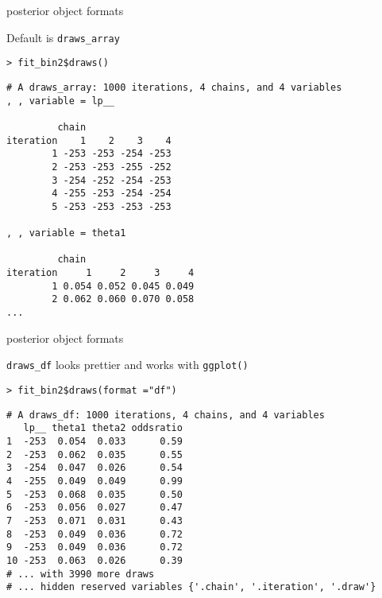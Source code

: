 \documentclass[finnish,english,t]{beamer}
\begin{document}
\begin{frame}[fragile]{posterior object formats}

  \vspace{-.5\baselineskip}
  Default is \texttt{draws\_array}
  
{\footnotesize
\begin{verbatim}
> fit_bin2$draws()
\end{verbatim}
  \vspace{-\baselineskip}
\begin{verbatim}
# A draws_array: 1000 iterations, 4 chains, and 4 variables
, , variable = lp__

         chain
iteration    1    2    3    4
        1 -253 -253 -254 -253
        2 -253 -253 -255 -252
        3 -254 -252 -254 -253
        4 -255 -253 -254 -254
        5 -253 -253 -253 -253

, , variable = theta1

         chain
iteration     1     2     3     4
        1 0.054 0.052 0.045 0.049
        2 0.062 0.060 0.070 0.058
...
\end{verbatim}
  }

\end{frame}

\begin{frame}[fragile]{posterior object formats}

  \texttt{draws\_df} looks prettier and works with \texttt{ggplot()}
  
  {\footnotesize
\begin{verbatim}
> fit_bin2$draws(format ="df")
\end{verbatim}
  \vspace{-\baselineskip}
\begin{verbatim}
# A draws_df: 1000 iterations, 4 chains, and 4 variables
   lp__ theta1 theta2 oddsratio
1  -253  0.054  0.033      0.59
2  -253  0.062  0.035      0.55
3  -254  0.047  0.026      0.54
4  -255  0.049  0.049      0.99
5  -253  0.068  0.035      0.50
6  -253  0.056  0.027      0.47
7  -253  0.071  0.031      0.43
8  -253  0.049  0.036      0.72
9  -253  0.049  0.036      0.72
10 -253  0.063  0.026      0.39
# ... with 3990 more draws
# ... hidden reserved variables {'.chain', '.iteration', '.draw'}
\end{verbatim}
  }

\end{frame}
\end{document}
